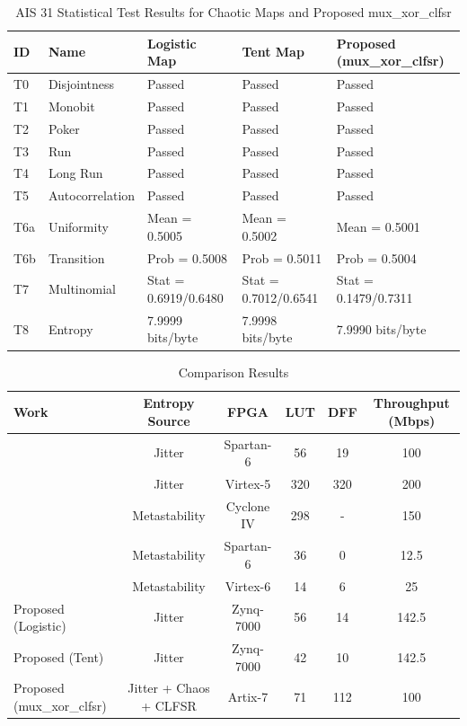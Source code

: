\begin{table}[t]
\centering
\caption{AIS 31 Statistical Test Results for Chaotic Maps and Proposed mux\_xor\_clfsr}
\label{tab:ais31_results}
\begin{tabular}{lllll}
\hline\hline
\textbf{ID} & \textbf{Name} & \textbf{Logistic Map} & \textbf{Tent Map} & \textbf{Proposed (mux\_xor\_clfsr)} \\
\hline
T0 & Disjointness & Passed & Passed & Passed \\
T1 & Monobit & Passed & Passed & Passed \\
T2 & Poker & Passed & Passed & Passed \\
T3 & Run & Passed & Passed & Passed \\
T4 & Long Run & Passed & Passed & Passed \\
T5 & Autocorrelation & Passed & Passed & Passed \\
\hline
T6a & Uniformity & Mean = 0.5005 & Mean = 0.5002 & Mean = 0.5001 \\
T6b & Transition & Prob = 0.5008 & Prob = 0.5011 & Prob = 0.5004 \\
T7 & Multinomial & Stat = 0.6919/0.6480 & Stat = 0.7012/0.6541 & Stat = 0.1479/0.7311 \\
T8 & Entropy & 7.9999 bits/byte & 7.9998 bits/byte & 7.9990 bits/byte \\
\hline\hline
\end{tabular}
\end{table}

\begin{table}[t]
\centering
\caption{Comparison Results}
\label{tab:comparison}
\begin{tabular}{lccccc}
\hline\hline
\textbf{Work} & \textbf{Entropy Source} & \textbf{FPGA} & \textbf{LUT} & \textbf{DFF} & \textbf{Throughput (Mbps)} \\
\hline
[3] & Jitter & Spartan-6 & 56 & 19 & 100 \\
[12] & Jitter & Virtex-5 & 320 & 320 & 200 \\
[13] & Metastability & Cyclone IV & 298 & - & 150 \\
[14] & Metastability & Spartan-6 & 36 & 0 & 12.5 \\
[15] & Metastability & Virtex-6 & 14 & 6 & 25 \\
Proposed (Logistic) & Jitter & Zynq-7000 & 56 & 14 & 142.5 \\
Proposed (Tent) & Jitter & Zynq-7000 & 42 & 10 & 142.5 \\
Proposed (mux_xor_clfsr) & Jitter + Chaos + CLFSR & Artix-7 & 71 & 112 & 100 \\
\hline\hline
\end{tabular}
\end{table}
